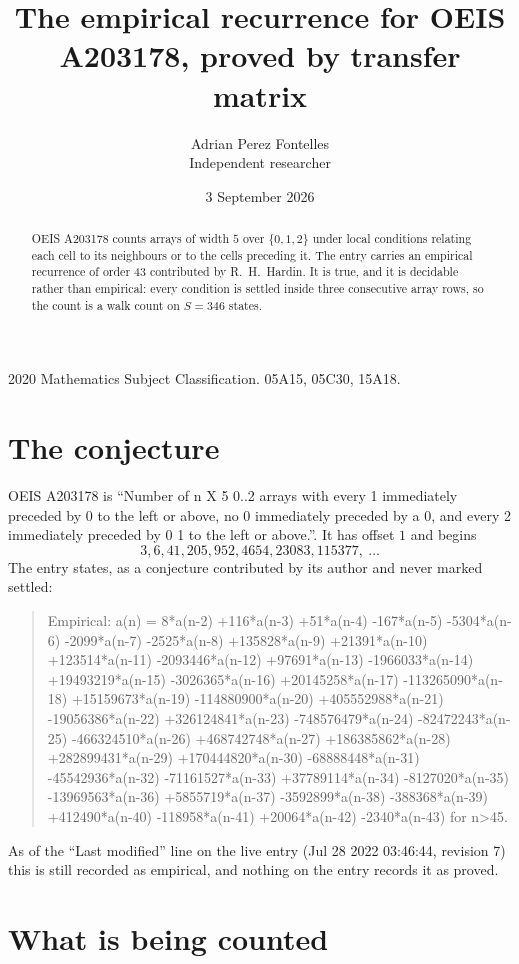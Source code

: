 \documentclass[11pt,a4paper]{article}
\title{The empirical recurrence for OEIS A203178, proved by transfer matrix}
\author{Adrian Perez Fontelles\\ \small Independent researcher}
\date{3 September 2026}
\theoremstyle{plain}
\theoremstyle{definition}
\begin{document}
\maketitle

\begin{abstract}
OEIS A203178 counts arrays of width $5$ over $\{0,1,2\}$ under local conditions relating each cell
to its neighbours or to the cells preceding it. The entry carries an empirical recurrence of
order $43$ contributed by R.~H.~Hardin. It is true, and it is decidable rather than
empirical: every condition is settled inside three consecutive array rows, so the count is a
walk count on $S=346$ states.
\end{abstract}

\noindent\small 2020 Mathematics Subject Classification. 05A15, 05C30, 15A18.\normalsize

\section{The conjecture}

OEIS A203178 is ``Number of n X 5 0..2 arrays with every 1 immediately preceded by 0 to the left or above, no 0 immediately preceded by a 0, and every 2 immediately preceded by 0 1 to the left or above.''. It has offset $1$ and begins
\[
3, 6, 41, 205, 952, 4654, 23083, 115377,\ \dots
\]
The entry states, as a conjecture contributed by its author and never marked settled:
\begin{quote}
Empirical: a(n) = 8*a(n-2) +116*a(n-3) +51*a(n-4) -167*a(n-5) -5304*a(n-6) -2099*a(n-7) -2525*a(n-8) +135828*a(n-9) +21391*a(n-10) +123514*a(n-11) -2093446*a(n-12) +97691*a(n-13) -1966033*a(n-14) +19493219*a(n-15) -3026365*a(n-16) +20145258*a(n-17) -113265090*a(n-18) +15159673*a(n-19) -114880900*a(n-20) +405552988*a(n-21) -19056386*a(n-22) +326124841*a(n-23) -748576479*a(n-24) -82472243*a(n-25) -466324510*a(n-26) +468742748*a(n-27) +186385862*a(n-28) +282899431*a(n-29) +170444820*a(n-30) -68888448*a(n-31) -45542936*a(n-32) -71161527*a(n-33) +37789114*a(n-34) -8127020*a(n-35) -13969563*a(n-36) +5855719*a(n-37) -3592899*a(n-38) -388368*a(n-39) +412490*a(n-40) -118958*a(n-41) +20064*a(n-42) -2340*a(n-43) for n>45.
\end{quote}
As of the ``Last modified'' line on the live entry (Jul 28 2022 03:46:44, revision 7) this is still
recorded as empirical, and nothing on the entry records it as proved.

\section{What is being counted}
\end{document}
